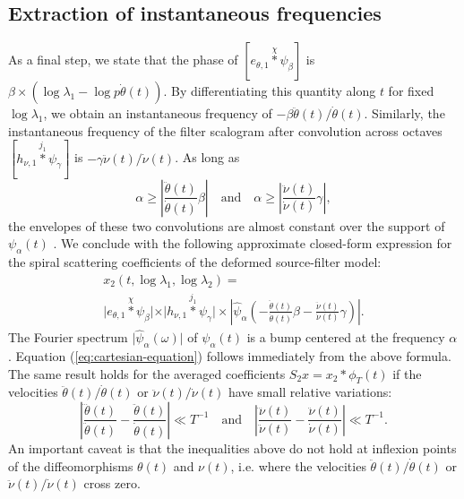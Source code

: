\documentclass[twoside,a4paper]{article}
\begin{document}
\subsection{Extraction of instantaneous frequencies}
As a final step, we state that the phase of $[ e_{\theta,1} \overset{\chi}{\ast} \psi_{\beta} ]$ is $\beta\times(\log \lambda_1 - \log p \dot{\theta}(t))$. By differentiating this quantity along $t$ for fixed $\log \lambda_1$, we obtain an instantaneous frequency of $- \beta \ddot{\theta}(t)/\dot{\theta}(t)$. Similarly, the instantaneous frequency of the filter scalogram after convolution across octaves $[h_{\nu,1} \overset{j_{1}}{\ast} \psi_{\gamma}]$ is $ - \gamma \ddot{\nu}(t)/\dot{\nu}(t)$. As long as
\begin{equation}
\alpha \geq \left \vert \frac{\ddot{\theta}(t)}{\dot{\theta}(t)} \beta \right \vert
\quad
\text{and}
\quad
\alpha \geq \left \vert \frac{\ddot{\nu}(t)}{\dot{\nu}(t)} \gamma \right \vert,
\end{equation}
the envelopes of these two convolutions are almost constant over the support of $\psi_{\alpha}(t)$ \cite{Delprat1992}. We conclude with the following approximate closed-form expression for the spiral scattering coefficients of the deformed source-filter model:
\begin{multline}
x_2(t,\log \lambda_1, \log \lambda_2) = \\
\vert e_{\theta,1} \overset{\chi}{\ast} \psi_\beta \vert \times
\vert h_{\nu,1} \overset{j_{1}}{\ast} \psi_\gamma \vert \times
\left \vert \widehat{\psi}_{\alpha} \left( -\frac{\ddot{\theta}(t)}{\dot{\theta}(t)} \beta - \frac{\ddot{\nu}(t)}{\dot{\nu}(t)} \gamma \right) \right \vert.
\label{eq:x2-sourcefilter}
\end{multline}
The Fourier spectrum $\vert \widehat{\psi}_\alpha(\omega) \vert$ of $\psi_\alpha(t)$ is a bump centered at the frequency $\alpha$. Equation (\ref{eq:cartesian-equation}) follows immediately from the above formula. The same result holds for the averaged coefficients $S_2 x = x_2 \ast \phi_T (t)$ if the velocities $\ddot{\theta}(t)/\dot{\theta}(t)$ or $\ddot{\nu}(t)/\dot{\nu}(t)$ have small relative variations:
\begin{equation}
\left \vert \frac{\dddot{\theta}(t)}{\ddot{\theta}(t)} - \frac{\ddot{\theta}(t)}{\dot{\theta}(t)} \right \vert \ll T^{-1}
\quad \text{and} \quad
\left \vert \frac{\dddot{\nu}(t)}{\ddot{\nu}(t)} - \frac{\ddot{\nu}(t)}{\dot{\nu}(t)} \right \vert \ll T^{-1}.
\end{equation}
An important caveat is that the inequalities above do not hold at inflexion points of the diffeomorphisms $\theta(t)$ and $\nu(t)$, i.e. where the velocities $\ddot{\theta}(t)/\dot{\theta}(t)$ or $\ddot{\nu}(t)/\dot{\nu}(t)$ cross zero.
\end{document}
